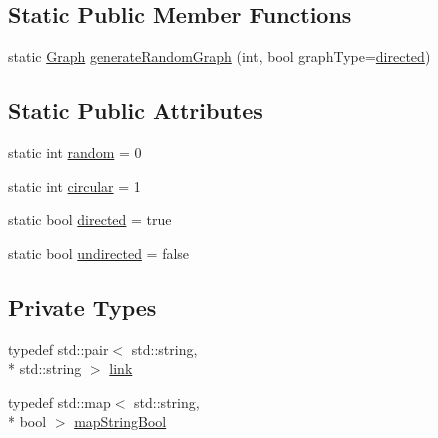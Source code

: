 \subsection*{Static Public Member Functions}
\begin{DoxyCompactItemize}
\item 
static \hyperlink{classGraphLib_1_1Graph}{Graph} \hyperlink{classGraphLib_1_1Graph_a876329f980ce91482a94341160a5b4af}{generate\-Random\-Graph} (int, bool graph\-Type=\hyperlink{classGraphLib_1_1Graph_a3111bb6cc59aedbc4290ed1b37668336}{directed})
\end{DoxyCompactItemize}
\subsection*{Static Public Attributes}
\begin{DoxyCompactItemize}
\item 
static int \hyperlink{classGraphLib_1_1Graph_a2286bc629c2b3e39e49428a90a9ba89f}{random} = 0
\item 
static int \hyperlink{classGraphLib_1_1Graph_ae60cf97b7bef2ca4d930b251581a3e7b}{circular} = 1
\item 
static bool \hyperlink{classGraphLib_1_1Graph_a3111bb6cc59aedbc4290ed1b37668336}{directed} = true
\item 
static bool \hyperlink{classGraphLib_1_1Graph_ac0c94d852cc820c10aefd1ef0f587fb0}{undirected} = false
\end{DoxyCompactItemize}
\subsection*{Private Types}
\begin{DoxyCompactItemize}
\item 
typedef std\-::pair$<$ std\-::string, \\*
std\-::string $>$ \hyperlink{classGraphLib_1_1Graph_aa27f00087e5578d92522f09a991dbad5}{link}
\item 
typedef std\-::map$<$ std\-::string, \\*
bool $>$ \hyperlink{classGraphLib_1_1Graph_a727ccf2fdc487a56e523a562f592b422}{map\-String\-Bool}
\end{DoxyCompactItemize}
